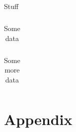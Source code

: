 \documentclass[12pt]{report}
\begin{document}

	\begin{table}
		\centering
		\begin{tabular}{|c|c|c|c|c|}
			\hline
			 
		\end{tabular}
		\label{tab:fegeinbaum}
		\caption{Stuff}
	\end{table}

	\begin{table}
		\centering
		\begin{tabular}{|c|c|c|c|c|}
			\hline
			 
		\end{tabular}
		\label{tab:chaos3}
		\caption{Some data}
	\end{table}

	\begin{table}
		\centering
		\begin{tabular}{|l|l|l|l|l|l|l|l|l|l|l|l|}
			\hline
			 
		\end{tabular}
		\label{tab:chaos2}
		\caption{Some more data}
	\end{table}

\chapter*{Appendix}

	
\end{document}
